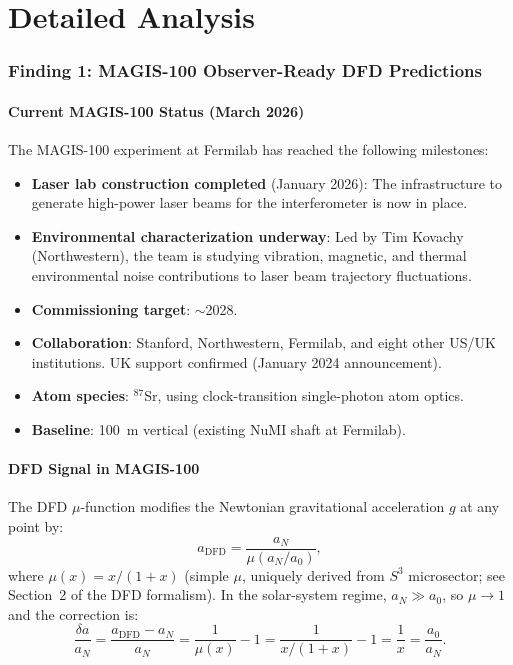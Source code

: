 \documentclass[11pt]{article}
\theoremstyle{definition}
\theoremstyle{remark}
\newcommand{\azero}{a_0}
\begin{document}
\part{Detailed Analysis}

\section{Finding 1: MAGIS-100 Observer-Ready DFD Predictions}
\label{sec:magis-predictions}

\subsection{Current MAGIS-100 Status (March 2026)}

The MAGIS-100 experiment at Fermilab has reached the following milestones:

\begin{itemize}[nosep]
\item \textbf{Laser lab construction completed} (January 2026): The
  infrastructure to generate high-power laser beams for the interferometer
  is now in place.
\item \textbf{Environmental characterization underway}: Led by Tim Kovachy
  (Northwestern), the team is studying vibration, magnetic, and thermal
  environmental noise contributions to laser beam trajectory fluctuations.
\item \textbf{Commissioning target}: $\sim$2028.
\item \textbf{Collaboration}: Stanford, Northwestern, Fermilab, and eight
  other US/UK institutions. UK support confirmed (January 2024 announcement).
\item \textbf{Atom species}: ${}^{87}$Sr, using clock-transition
  single-photon atom optics.
\item \textbf{Baseline}: 100~m vertical (existing NuMI shaft at Fermilab).
\end{itemize}

\subsection{DFD Signal in MAGIS-100}

The DFD $\mu$-function modifies the Newtonian gravitational acceleration
$g$ at any point by:
\begin{equation}
a_{\mathrm{DFD}} = \frac{a_N}{\mu(a_N/\azero)},
\label{eq:aDFD}
\end{equation}
where $\mu(x) = x/(1+x)$ (simple $\mu$, uniquely derived from $S^3$
microsector; see Section~2 of the DFD formalism). In the solar-system
regime, $a_N \gg \azero$, so $\mu \to 1$ and the correction is:
\begin{equation}
\frac{\delta a}{a_N} = \frac{a_{\mathrm{DFD}} - a_N}{a_N}
= \frac{1}{\mu(x)} - 1
= \frac{1}{x/(1+x)} - 1
= \frac{1}{x}
= \frac{\azero}{a_N}.
\label{eq:delta-a}
\end{equation}
\end{document}
